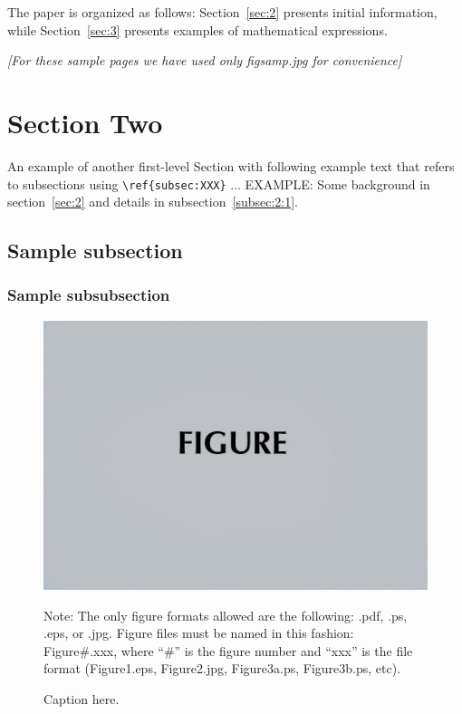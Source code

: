 \documentclass[reprint]{JASA}
\begin{document}
The paper is organized as follows: Section~\ref{sec:2} presents
initial information, while
Section~\ref{sec:3} presents examples of mathematical expressions.

{\it
[For these sample pages we have used only figsamp.jpg for
convenience]}




\section{\label{sec:2} Section Two}
An example of another first-level Section with following example text that refers to subsections using 
\verb+\ref{subsec:XXX}+ ...  EXAMPLE: Some background in
section~\ref{sec:2} and details  in subsection~\ref{subsec:2:1}. 

\subsection{\label{subsec:2:1} Sample subsection}

\subsubsection{Sample subsubsection\label{subsubsec:1}}



 
\begin{figure}
\includegraphics[width=\reprintcolumnwidth]{figsamp.jpg}
\caption{\label{fig:FIG1}{Caption here.}}
\raggedright
Note: The only figure formats allowed are the following: 
.pdf, .ps, .eps, or .jpg. Figure files must be named in this fashion:
Figure\#.xxx, where ``\#'' is the figure number and ``xxx'' is the file format
(Figure1.eps, Figure2.jpg, Figure3a.ps, Figure3b.ps, etc). 
\end{figure}
\end{document}
